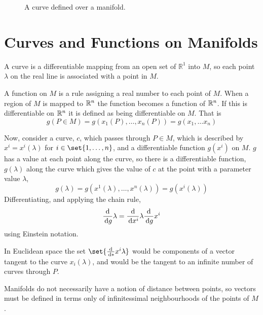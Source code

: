 \begin{figure}[t]
\caption{A curve defined over a manifold.}
  \label{fig:manifold-curve}
\end{figure}

\section{Curves and Functions on Manifolds}
\label{sec:curves}

A curve is a differentiable mapping from an open set of $\mathbb{R}^1$
into $M$, so each point $\lambda$ on the real line is associated with
a point in $M$.

A function on $M$ is a rule assigning a real number to each point of
$M$. When a region of $M$ is mapped to $\mathbb{R}^n$ the function becomes a
function of $\mathbb{R}^n$. If this is differentiable on $\mathbb{R}^n$ it is defined as
being differentiable on $M$. That is
\[ g(P \in M) = g(x_1(P), \dots, x_n(P)) = g(x_1, \dots x_n) \]

Now, consider a curve, $c$, which passes through $P \in M$, which is
described by $x^i = x^i(\lambda)$ for $i \in \set{1, \dots, n}$, and a
differentiable function $g(x^i)$ on $M$. $g$ has a value at each point
along the curve, so there is a differentiable function, $g(\lambda)$
along the curve which gives the value of $c$ at the point with a parameter value $\lambda$,
\[ g(\lambda) = g(x^1(\lambda), \dots, x^n(\lambda) ) =
g(x^i(\lambda)) \]
Differentiating, and applying the chain rule,
\begin{equation}
  \label{eq:6}
  \frac{\mathrm{d}}{\,\mathrm{d} g}{\lambda} = \frac{\mathrm{d}}{\,\mathrm{d} x^i}{\lambda} \frac{\mathrm{d}}{\,\mathrm{d} g}{x^i}
\end{equation}
using Einstein notation.

In Euclidean space the set $\set{ \dv*{x^i}{\lambda} }$ would be
components of a vector tangent to the curve $x_i(\lambda)$, and would
be the tangent to an infinite number of curves through $P$.

Manifolds do not necessarily have a notion of distance between points,
so vectors must be defined in terms only of infinitessimal
neighbourhoods of the points of $M$. 

